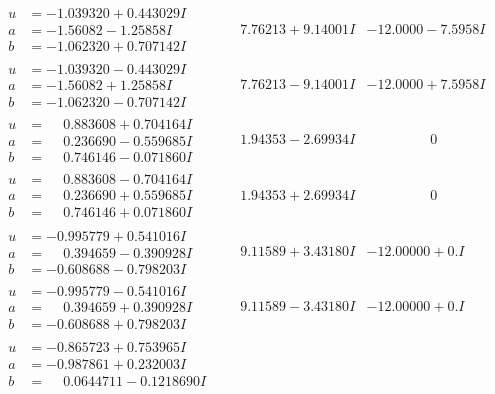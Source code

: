 \documentclass[1p]{elsarticle_modified}
\theoremstyle{definition}
\begin{document}
$$\begin{array}{c|c|c}
\begin{aligned}
u &= -1.039320 + 0.443029 I \\
a &= -1.56082 - 1.25858 I \\
b &= -1.062320 + 0.707142 I\end{aligned}
 & \phantom{-}7.76213 + 9.14001 I & -12.0000 - 7.5958 I \\ \hline\begin{aligned}
u &= -1.039320 - 0.443029 I \\
a &= -1.56082 + 1.25858 I \\
b &= -1.062320 - 0.707142 I\end{aligned}
 & \phantom{-}7.76213 - 9.14001 I & -12.0000 + 7.5958 I \\ \hline\begin{aligned}
u &= \phantom{-}0.883608 + 0.704164 I \\
a &= \phantom{-}0.236690 - 0.559685 I \\
b &= \phantom{-}0.746146 - 0.071860 I\end{aligned}
 & \phantom{-}1.94353 - 2.69934 I & \phantom{-0.000000 } 0 \\ \hline\begin{aligned}
u &= \phantom{-}0.883608 - 0.704164 I \\
a &= \phantom{-}0.236690 + 0.559685 I \\
b &= \phantom{-}0.746146 + 0.071860 I\end{aligned}
 & \phantom{-}1.94353 + 2.69934 I & \phantom{-0.000000 } 0 \\ \hline\begin{aligned}
u &= -0.995779 + 0.541016 I \\
a &= \phantom{-}0.394659 - 0.390928 I \\
b &= -0.608688 - 0.798203 I\end{aligned}
 & \phantom{-}9.11589 + 3.43180 I & -12.00000 + 0. I\phantom{ +0.000000I} \\ \hline\begin{aligned}
u &= -0.995779 - 0.541016 I \\
a &= \phantom{-}0.394659 + 0.390928 I \\
b &= -0.608688 + 0.798203 I\end{aligned}
 & \phantom{-}9.11589 - 3.43180 I & -12.00000 + 0. I\phantom{ +0.000000I} \\ \hline\begin{aligned}
u &= -0.865723 + 0.753965 I \\
a &= -0.987861 + 0.232003 I \\
b &= \phantom{-}0.0644711 - 0.1218690 I\end{aligned}

\end{array}$$
\end{document}
